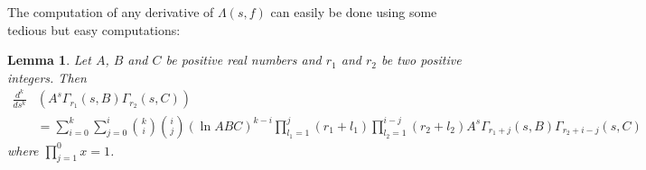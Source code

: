 \documentclass{article}
\theoremstyle{plain}
\newtheorem{lemma}{Lemma}
\begin{document}
The computation of any derivative of $\Lambda(s,f)$ can easily be done using some tedious but easy computations:
\begin{lemma}\label{computation1}
Let $A$, $B$ and $C$ be positive real numbers and $r_1$ and $r_2$ be two positive integers. Then
\begin{equation*}
\begin{split}
\frac{d^k}{ds^k} & \left( A^{s} \Gamma_{r_1}(s,B) \Gamma_{r_2}(s, C)\right)\\
&= \sum_{i=0}^{k}\sum_{j=0}^{i}\binom{k}{i}\binom{i}{j} (\ln ABC)^{k-i} \prod_{l_1=1}^{j} (r_1+l_1) \prod_{l_2=1}^{i-j}(r_2+l_2)
A^{s} \Gamma_{r_1+j}(s,B) \Gamma_{r_2+i-j}(s, C)
\end{split}
\end{equation*}
where $\prod_{j=1}^{0} x =1$.
\end{lemma}
\end{document}

